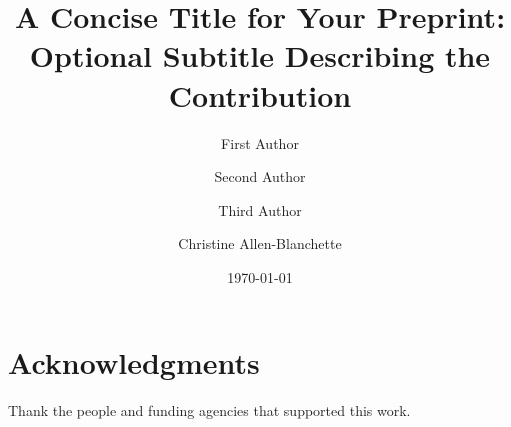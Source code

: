 \documentclass{cablab}
\title{A Concise Title for Your Preprint:\\Optional Subtitle Describing the Contribution}
\author[1,*]{First Author}
\author[1,*]{Second Author}
\author[2]{Third Author}
\author[1,\dagger]{Christine Allen-Blanchette}
\affiliation[1]{Princeton University}
\affiliation[2]{Another Institution}
\date{\today}
\begin{document}
\maketitle






\section*{Acknowledgments}
Thank the people and funding agencies that supported this work.




\beginappendix

\end{document}
